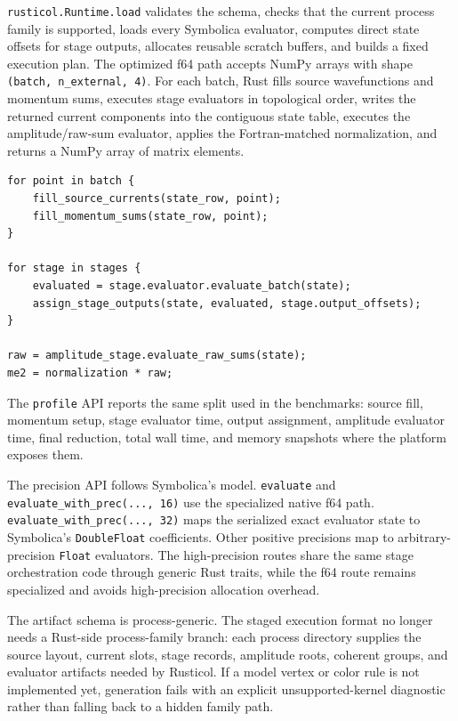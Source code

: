 \documentclass[10pt]{article}
\begin{document}
\texttt{rusticol.Runtime.load} validates the schema, checks that the current
process family is supported, loads every Symbolica evaluator, computes direct
state offsets for stage outputs, allocates reusable scratch buffers, and builds
a fixed execution plan.  The optimized f64 path accepts NumPy arrays with shape
\texttt{(batch, n\_external, 4)}.  For each batch, Rust fills source
wavefunctions and momentum sums, executes stage evaluators in topological order,
writes the returned current components into the contiguous state table, executes
the amplitude/raw-sum evaluator, applies the Fortran-matched normalization, and
returns a NumPy array of matrix elements.
\begin{lstlisting}
for point in batch {
    fill_source_currents(state_row, point);
    fill_momentum_sums(state_row, point);
}

for stage in stages {
    evaluated = stage.evaluator.evaluate_batch(state);
    assign_stage_outputs(state, evaluated, stage.output_offsets);
}

raw = amplitude_stage.evaluate_raw_sums(state);
me2 = normalization * raw;
\end{lstlisting}
The \texttt{profile} API reports the same split used in the benchmarks: source
fill, momentum setup, stage evaluator time, output assignment, amplitude
evaluator time, final reduction, total wall time, and memory snapshots where the
platform exposes them.

The precision API follows Symbolica's model.  \texttt{evaluate} and
\texttt{evaluate\_with\_prec(..., 16)} use the specialized native f64 path.
\texttt{evaluate\_with\_prec(..., 32)} maps the serialized exact evaluator state
to Symbolica's \texttt{DoubleFloat} coefficients.  Other positive precisions map
to arbitrary-precision \texttt{Float} evaluators.  The high-precision routes
share the same stage orchestration code through generic Rust traits, while the
f64 route remains specialized and avoids high-precision allocation overhead.

The artifact schema is process-generic.  The staged execution format no longer
needs a Rust-side process-family branch: each process directory supplies the
source layout, current slots, stage records, amplitude roots, coherent groups,
and evaluator artifacts needed by Rusticol.  If a model vertex or color rule is
not implemented yet, generation fails with an explicit unsupported-kernel
diagnostic rather than falling back to a hidden family path.



\end{document}
